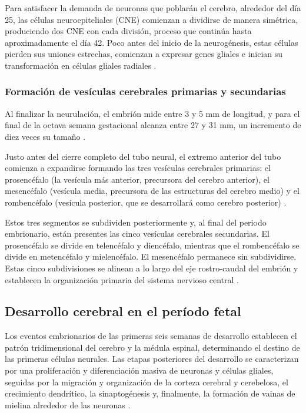 Para satisfacer la demanda de neuronas que poblarán el cerebro, alrededor del
día 25, las células neuroepiteliales (CNE) comienzan a dividirse de manera
simétrica, produciendo dos CNE con cada división, proceso que continúa hasta
aproximadamente el día 42. Poco antes del inicio de la neurogénesis, estas
células pierden sus uniones estrechas, comienzan a expresar genes gliales e
inician su transformación en células gliales radiales \cite{Stiles2010}.

\subsubsection{Formación de vesículas cerebrales primarias y secundarias}
Al finalizar la neurulación, el embrión mide entre 3 y 5 mm de longitud, y para
el final de la octava semana gestacional alcanza entre 27 y 31 mm, un
incremento de diez veces su tamaño \cite{Stiles2010}.

Justo antes del cierre completo del tubo neural, el extremo anterior del tubo
comienza a expandirse formando las tres vesículas cerebrales primarias: el
prosencéfalo (la vesícula más anterior, precursora del cerebro anterior), el
mesencéfalo (vesícula media, precursora de las estructuras del cerebro medio) y
el rombencéfalo (vesícula posterior, que se desarrollará como cerebro
posterior) \cite{Stiles2010}.

Estos tres segmentos se subdividen posteriormente y, al final del periodo
embrionario, están presentes las cinco vesículas cerebrales secundarias. El
prosencéfalo se divide en telencéfalo y diencéfalo, mientras que el
rombencéfalo se divide en metencéfalo y mielencéfalo. El mesencéfalo permanece
sin subdividirse. Estas cinco subdivisiones se alinean a lo largo del eje
rostro-caudal del embrión y establecen la organización primaria del sistema
nervioso central \cite{Stiles2010}.

\subsection{Desarrollo cerebral en el período fetal}
Los eventos embrionarios de las primeras seis semanas de desarrollo establecen
el patrón tridimensional del cerebro y la médula espinal, determinando el
destino de las primeras células neurales. Las etapas posteriores del desarrollo
se caracterizan por una proliferación y diferenciación masiva de neuronas y
células gliales, seguidas por la migración y organización de la corteza
cerebral y cerebelosa, el crecimiento dendrítico, la sinaptogénesis y,
finalmente, la formación de vainas de mielina alrededor de las neuronas
\cite{Polin124}.

